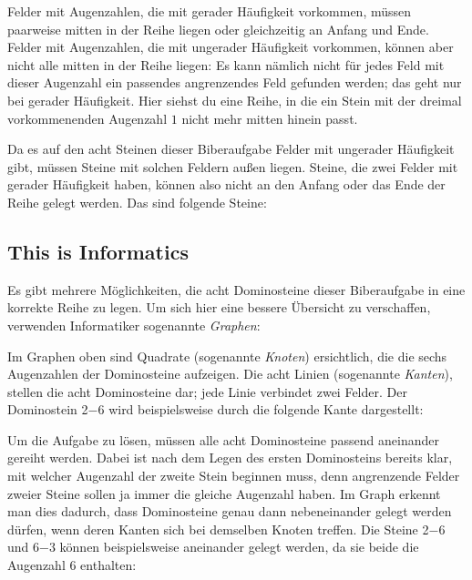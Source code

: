 \documentclass[a4paper,11pt]{report}
\newcommand{\taskGraphicsFolder}{..}
\begin{document}
Felder mit Augenzahlen, die mit gerader Häufigkeit vorkommen, müssen paarweise mitten in der Reihe liegen oder gleichzeitig an Anfang und Ende. Felder mit Augenzahlen, die mit ungerader Häufigkeit vorkommen, können aber nicht alle mitten in der Reihe liegen: Es kann nämlich nicht für jedes Feld mit dieser Augenzahl ein passendes angrenzendes Feld gefunden werden; das geht nur bei gerader Häufigkeit. Hier siehst du eine Reihe, in die ein Stein mit der dreimal vorkommenenden Augenzahl $1$ nicht mehr mitten hinein passt.

{\centering%
\par}

Da es auf den acht Steinen dieser Biberaufgabe Felder mit ungerader Häufigkeit gibt, müssen Steine mit solchen Feldern außen liegen.  Steine, die zwei Felder mit gerader Häufigkeit haben, können also nicht an den Anfang oder das Ende der Reihe gelegt werden. Das sind folgende Steine:

{\centering%
\par}


\subsection*{This is Informatics}

Es gibt mehrere Möglichkeiten, die acht Dominosteine dieser Biberaufgabe in eine korrekte Reihe zu legen. Um sich hier eine bessere Übersicht zu verschaffen, verwenden Informatiker sogenannte \emph{Graphen}:

{\centering%
\par}

Im Graphen oben sind Quadrate (sogenannte \emph{Knoten}) ersichtlich, die die sechs Augenzahlen der Dominosteine aufzeigen. Die acht Linien (sogenannte \emph{Kanten}), stellen die acht Dominosteine dar; jede Linie verbindet zwei Felder. Der Dominostein 2$-6$ wird beispielsweise durch die folgende Kante dargestellt:

{\centering%
\par}

Um die Aufgabe zu lösen, müssen alle acht Dominosteine passend aneinander gereiht werden. Dabei ist nach dem Legen des ersten Dominosteins bereits klar, mit welcher Augenzahl der zweite Stein beginnen muss, denn angrenzende Felder zweier Steine sollen ja immer die gleiche Augenzahl haben. Im Graph erkennt man dies dadurch, dass Dominosteine genau dann nebeneinander gelegt werden dürfen, wenn deren Kanten sich bei demselben Knoten treffen. Die Steine 2$-6$ und 6$-3$ können beispielsweise aneinander gelegt werden, da sie beide die Augenzahl $6$ enthalten:
\end{document}
